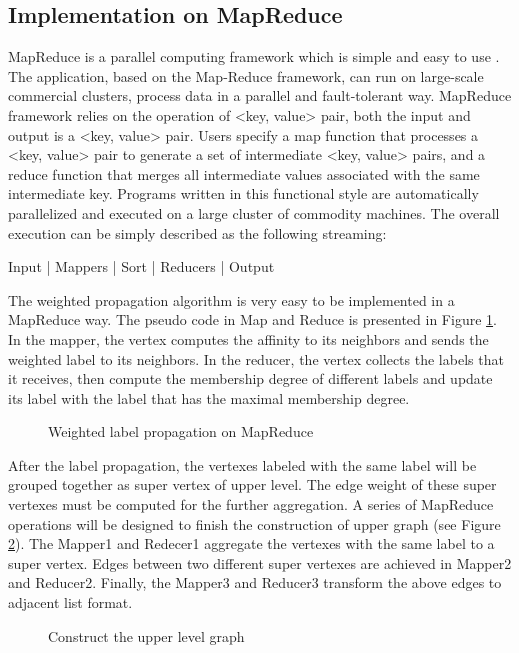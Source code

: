 \documentclass{acm_proc_article-sp}
\begin{document}
\subsection{Implementation on MapReduce}
MapReduce is a parallel computing framework which is simple and easy to use \cite{dean:mapreduce:}. The application, based on the Map-Reduce framework, can run on large-scale commercial clusters, process data in a parallel and fault-tolerant way. MapReduce framework relies on the operation of <key, value> pair, both the input and output is a <key, value> pair. Users specify a map function that processes a <key, value> pair to generate a set of intermediate <key, value> pairs, and a reduce function that merges all intermediate values associated with the same intermediate key. Programs written in this functional style are automatically parallelized and executed on a large cluster of commodity machines. The overall execution can be simply described as the following streaming:
\par
\begin{center}
Input | Mappers | Sort | Reducers | Output
\end{center}
\par
The weighted propagation algorithm is very easy to be implemented in a MapReduce way. The pseudo code in Map and Reduce is presented in Figure \ref{fig:wlp}. In the mapper, the vertex computes the affinity to its neighbors and sends the weighted label to its neighbors. In the reducer, the vertex collects the labels that it receives, then compute the membership degree of different labels and update its label with the label that has the maximal membership degree.
\begin{figure}
\centering
{}
\caption{Weighted label propagation on MapReduce}
\label{fig:wlp}
\end{figure}
\par
After the label propagation, the vertexes labeled with the same label will be grouped together as super vertex of upper level. The edge weight of these super vertexes must be computed for the further aggregation. A series of MapReduce operations will be designed to finish the construction of upper graph (see Figure \ref{fig:upper}). The Mapper1 and Redecer1 aggregate the vertexes with the same label to a super vertex. Edges between two different super vertexes are achieved in Mapper2 and Reducer2. Finally, the Mapper3 and Reducer3 transform the above edges to adjacent list format.
\begin{figure}
\centering
{}
\caption{Construct the upper level graph}
\label{fig:upper}
\end{figure}
\end{document}
